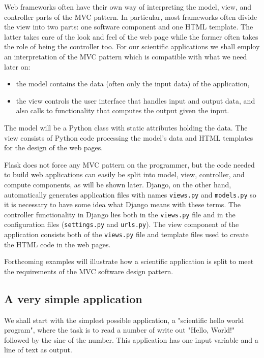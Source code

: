 \documentclass[%
oneside,                 %
final,                   %
10pt]{article}
\begin{document}
Web frameworks often have their own way of interpreting the
model, view, and controller parts of the MVC pattern.
In particular, most frameworks often divide the view into two parts:
one software component and one HTML template. The latter takes care
of the look and feel of the web page while the former often takes
the role of being the controller too.
For our scientific applications
we shall employ an interpretation of the MVC pattern
which is compatible with what we need later on:

\begin{itemize}
 \item the model contains the data (often only the input data) of the application,

 \item the view controls the user interface that handles input and output data,
   and also calls to functionality that computes the output given the input.
\end{itemize}

\noindent
The model will be a Python class with static attributes holding the data.
The view consists of Python code processing the model's data and HTML
templates for the design of the web pages.

Flask does not force any MVC pattern on the programmer, but
the code needed to build web applications can easily be split into
model, view, controller, and compute components, as will be shown later.
Django, on the other hand, automatically generates application files with names
\Verb!views.py! and \Verb!models.py! so it is
necessary to have some idea what Django means with these terms.
The controller functionality in Django lies both in the \Verb!views.py! file and
in the configuration
files (\Verb!settings.py! and \Verb!urls.py!). The view component of the application
consists both of the \Verb!views.py! file and template files used to create
the HTML code in the web pages.

Forthcoming examples will illustrate how a scientific application is
split to meet the requirements of the MVC software design pattern.

\subsection{A very simple application}



We shall start with the simplest possible application,
a "scientific hello world program", where the
task is to read a number of write out "Hello, World!" followed by
the sine of the number. This application has one input variable and
a line of text as output.
\end{document}
